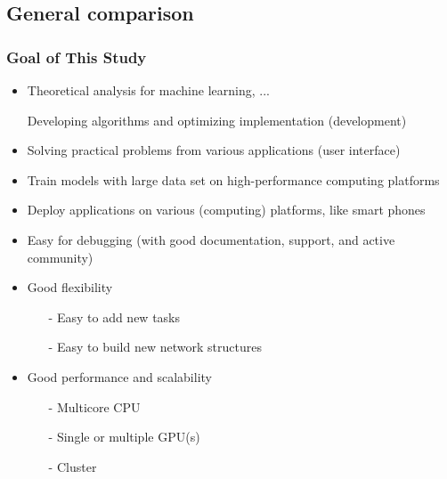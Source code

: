 \subsection{General comparison}


\begin{frame}
  \MyLogo
  \frametitle{Goal of This Study}  
\small

\medskip
{}
\begin{itemize}
\item Theoretical analysis for machine learning, ...
\item[\raisebox{-0.4ex}{\alert{\HandRight}}] Developing algorithms and optimizing implementation (development)
\item Solving practical problems from various applications (user interface)
\end{itemize}

\pause

\begin{itemize}
\item Train models with large data set on high-performance computing platforms
\item Deploy applications on various (computing) platforms, like smart phones
\end{itemize}

\pause

\begin{itemize}
\item Easy for debugging (with good \alert{documentation}, \alert{support}, and active community)
\item Good flexibility
	\begin{itemize}\scriptsize
	\item[-] Easy to add new tasks
	\item[-] Easy to build new network structures
	\end{itemize}
\item Good performance and scalability
	\begin{itemize}\scriptsize
	\item[-] Multicore CPU
	\item[-] \alert{Single} or \alert{multiple} GPU(s)
	\item[-] Cluster
	\end{itemize}
\end{itemize}

\end{frame}

